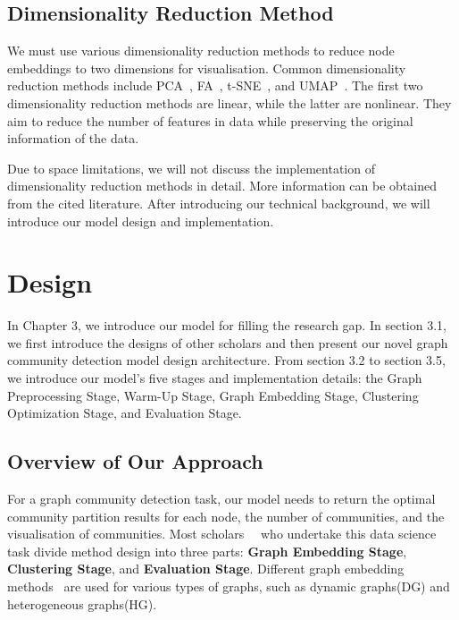 \documentclass[ %
                    author={Tengyao Tu},
                supervisor={Dr. James Pope},
                    degree={MSc},
                     title={A New Perspective on Graph Community Detection: Combining Traditional Methods with Deep Learning Approaches},
                  subtitle={Applying to Telecom Networks and Diverse Datasets},
                      type={},
                      year={2024}]{dissertation}
\begin{document}
\section{Dimensionality Reduction Method}
We must use various dimensionality reduction methods to reduce node embeddings to two dimensions for visualisation. Common dimensionality reduction methods include PCA~\cite{abdi2010principal}, FA~\cite{kline2014easy}, t-SNE~\cite{van2008visualizing}, and UMAP~\cite{mcinnes2018umap}. The first two dimensionality reduction methods are linear, while the latter are nonlinear. They aim to reduce the number of features in data while preserving the original information of the data.

Due to space limitations, we will not discuss the implementation of dimensionality reduction methods in detail. More information can be obtained from the cited literature. After introducing our technical background, we will introduce our model design and implementation.

\chapter{Design}
\label{chap:Design}
In Chapter 3, we introduce our model for filling the research gap. In section 3.1, we first introduce the designs of other scholars and then present our novel graph community detection model design architecture. From section 3.2 to section 3.5, we introduce our model's five stages and implementation details: the Graph Preprocessing Stage, Warm-Up Stage, Graph Embedding Stage, Clustering Optimization Stage, and Evaluation Stage.
\section{Overview of Our Approach}
For a graph community detection task, our model needs to return the optimal community partition results for each node, the number of communities, and the visualisation of communities. Most scholars~\cite{gmati2024new}~\cite{liu2024community2} who undertake this data science task divide method design into three parts: \textbf{Graph Embedding Stage}, \textbf{Clustering Stage}, and \textbf{Evaluation Stage}. Different graph embedding methods~\cite{sahu2024df} are used for various types of graphs, such as dynamic graphs(DG) and heterogeneous graphs(HG).
\end{document}
